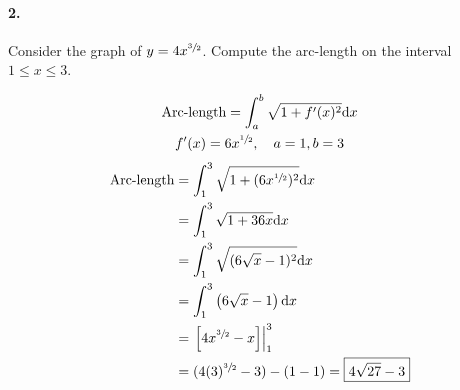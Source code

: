    \paragraph*{2.}
    Consider the graph of $y=4x^{\sfrac{3}{2}}$. Compute the arc-length on the interval $1 \leq x \leq 3$.
    \\
    \begin{mdframed}
        \begin{equation*}
            \begin{gathered}
                \text{Arc-length} = \int_{a}^{b}\sqrt{1 + f'(x)^2} \mathrm{d}x  \\
                f'(x) = 6x^{\sfrac{1}{2}}, \quad a = 1, b = 3
            \end{gathered}
        \end{equation*}
        \begin{align*}
            \text{Arc-length}   & = \int_{1}^{3}\sqrt{1 + (6x^{\sfrac{1}{2}})^2}\mathrm{d}x \\
                                & = \int_{1}^{3}\sqrt{1 + 36x}\mathrm{d}x                   \\
                                & = \int_{1}^{3}\sqrt{(6\sqrt{x} - 1)^2}\mathrm{d}x         \\
                                & = \int_{1}^{3}\left(6\sqrt{x} - 1\right)\mathrm{d}x       \\
                                & = \left.\left[4x^{\sfrac{3}{2}}-x\right]\right|_1^3       \\
                                & = (4(3)^{\sfrac{3}{2}}-3) - (1 - 1) = \boxed{4\sqrt{27}-3}\\
        \end{align*}
    \end{mdframed}

    \pagebreak


